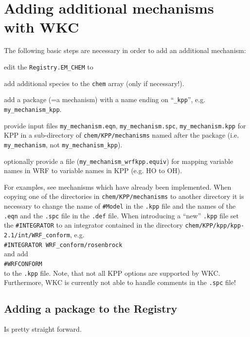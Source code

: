 \documentclass[twoside, 12pt, letterpaper]{article}
\newenvironment{V0}%
  {\begin{list}{}{\renewcommand{\makelabel}[1]{\hfil $\bullet$}%
  \setlength{\leftmargin}{6mm}}}%
 {\end{list}}
\newenvironment{V1}%
  {\begin{list}{}{\renewcommand{\makelabel}[1]{\hfil \tiny $\bullet$}%
   \vspace{-2mm}%
  \setlength{\itemsep}{-\parsep}
  \setlength{\leftmargin}{3mm}}
}%
 {\end{list}}
\begin{document}
\section{Adding additional mechanisms with WKC}\label{sec:add_mech}
The following basic steps are necessary in order to add an additional mechanism:\begin{V0}
\item edit the {\tt Registry.EM\_CHEM} to 
  \begin{V1}
  \item add additional species to the {\tt chem} array (only if necessary!). 
  \item add a package (=a mechanism) with a name ending on ``{\tt \_kpp}'', e.g. {\tt my\_mechanism\_kpp}.
  \end{V1}
\item provide input files {\tt my\_mechanism.eqn}, {\tt my\_mechanism.spc}, {\tt my\_mechanism.kpp} for KPP in a sub-directory of {\tt chem/KPP/mechanisms} named after the package (i.e. {\tt my\_mechanism}, not  {\tt my\_mechanism\_kpp}).  
\item optionally provide a file ({\tt my\_mechanism\_wrfkpp.equiv}) for mapping variable names in WRF to variable names in KPP (e.g. HO to OH).  
\end{V0}
For examples, see mechanisms which have already been implemented. When copying one of the directories in {\tt chem/KPP/mechanisms} to another directory it is necessary to change the name of {\tt \#Model} in the {\tt .kpp} file and the names of the {\tt .eqn} and the {\tt .spc} file in the {\tt .def} file. When introducing a ``new'' {\tt .kpp} file set the {\tt \#INTEGRATOR} to an integrator contained in the directory {\tt chem/KPP/kpp/kpp-2.1/int/WRF\_conform}, e.g.\smallskip \\
{\tt \#INTEGRATOR WRF\_conform/rosenbrock}\smallskip\\
and add\smallskip\\
{\tt \#WRFCONFORM}\smallskip\\
to the {\tt .kpp} file. Note, that not all KPP options are supported by WKC. Furthermore, WKC is currently not able to handle comments in the {\tt .spc} file! 

\subsection{Adding a package to the Registry}
 Is pretty straight forward.
\end{document}
